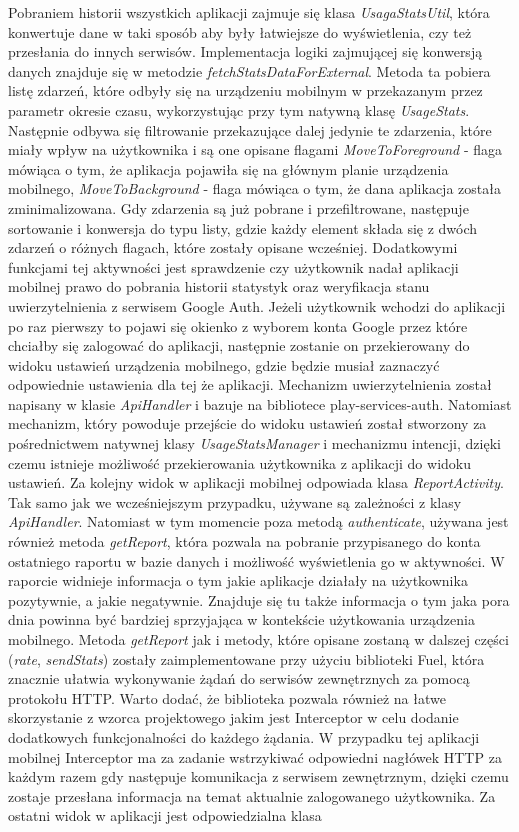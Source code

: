 \documentclass[a4paper,twoside,12pt]{book}
\begin{document}
\begin{description}
Pobraniem historii wszystkich aplikacji zajmuje się klasa \textit{UsagaStatsUtil}, która konwertuje dane w taki sposób aby były łatwiejsze do wyświetlenia, czy też przesłania do innych serwisów. Implementacja logiki zajmującej się konwersją danych znajduje się w metodzie \textit{fetchStatsDataForExternal}. Metoda ta pobiera listę zdarzeń, które odbyły się na urządzeniu mobilnym w przekazanym przez parametr okresie czasu, wykorzystując przy tym natywną klasę \textit{UsageStats}. Następnie odbywa się filtrowanie przekazujące dalej jedynie te zdarzenia, które miały wpływ na użytkownika i są one opisane flagami \textit{MoveToForeground} - flaga mówiąca o tym, że aplikacja pojawiła się na głównym planie urządzenia mobilnego, \textit{MoveToBackground} - flaga mówiąca o tym, że dana aplikacja została zminimalizowana. Gdy zdarzenia są już pobrane i przefiltrowane, następuje sortowanie i konwersja do typu listy, gdzie każdy element składa się z dwóch zdarzeń o różnych flagach, które zostały opisane wcześniej. Dodatkowymi funkcjami tej aktywności jest sprawdzenie czy użytkownik nadał aplikacji mobilnej prawo do pobrania historii statystyk oraz weryfikacja stanu uwierzytelnienia z serwisem Google Auth\cite{auth_api}. Jeżeli użytkownik wchodzi do aplikacji po raz pierwszy to pojawi się okienko z wyborem konta Google przez które chciałby się zalogować do aplikacji, następnie zostanie on przekierowany do widoku ustawień urządzenia mobilnego, gdzie będzie musiał zaznaczyć odpowiednie ustawienia dla tej że aplikacji. Mechanizm uwierzytelnienia został napisany w klasie \textit{ApiHandler} i bazuje na bibliotece play-services-auth. Natomiast mechanizm, który powoduje przejście do widoku ustawień został stworzony za pośrednictwem natywnej klasy \textit{UsageStatsManager}\cite{usage_stats_api} i mechanizmu intencji, dzięki czemu istnieje możliwość przekierowania użytkownika z aplikacji do widoku ustawień. Za kolejny widok w aplikacji mobilnej odpowiada klasa \textit{ReportActivity}. Tak samo jak we wcześniejszym przypadku, używane są zależności z klasy \textit{ApiHandler}. Natomiast w tym momencie poza metodą \textit{authenticate}, używana jest również metoda \textit{getReport}, która pozwala na pobranie przypisanego do konta ostatniego raportu w bazie danych i możliwość wyświetlenia go w aktywności. W raporcie widnieje informacja o tym jakie aplikacje działały na użytkownika pozytywnie, a jakie negatywnie. Znajduje się tu także informacja o tym jaka pora dnia powinna być bardziej sprzyjająca w kontekście użytkowania urządzenia mobilnego. Metoda \textit{getReport} jak i metody, które opisane zostaną w dalszej części (\textit{rate}, \textit{sendStats}) zostały zaimplementowane przy użyciu biblioteki Fuel, która znacznie ułatwia wykonywanie żądań do serwisów zewnętrznych za pomocą protokołu HTTP. Warto dodać, że biblioteka pozwala również na łatwe skorzystanie z wzorca projektowego jakim jest Interceptor w celu dodanie dodatkowych funkcjonalności do każdego żądania. W przypadku tej aplikacji mobilnej Interceptor ma za zadanie wstrzykiwać odpowiedni nagłówek HTTP za każdym razem gdy następuje komunikacja z serwisem zewnętrznym, dzięki czemu zostaje przesłana informacja na temat aktualnie zalogowanego użytkownika. Za ostatni widok w aplikacji jest odpowiedzialna klasa 
\end{description}
\end{document}
